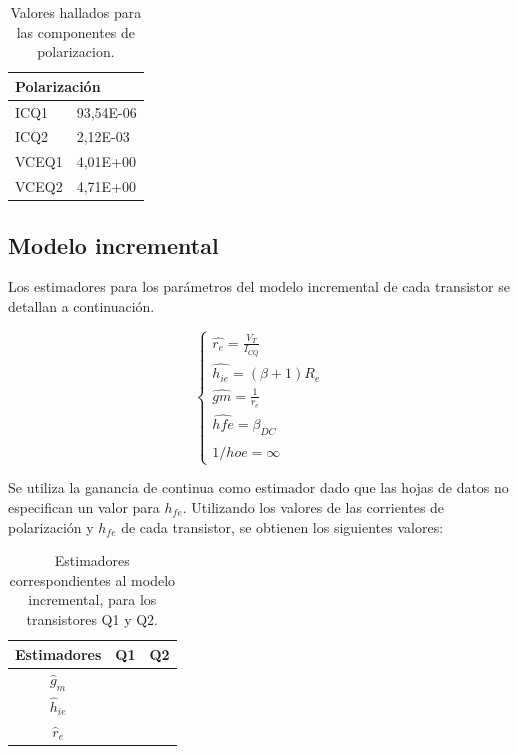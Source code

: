 \begin{table}[H]
	\centering
\begin{tabular}{ll}
\multicolumn{2}{l}{Polarización} \\ \hline
ICQ1          & 93,54E-06        \\
ICQ2         & 2,12E-03         \\
VCEQ1         & 4,01E+00         \\
VCEQ2         & 4,71E+00        
\end{tabular}
\caption{Valores hallados para las componentes de polarizacion.}
\label{tabla_valores_polarizacion}  
\end{table}


	\subsection{Modelo incremental}
	
	Los estimadores para los parámetros del modelo incremental de cada transistor se detallan a continuación.

		\begin{equation}
			\begin{cases}
			\widehat{r_{e}}=\frac{V_{T}}{I_{CQ}}\\
			\widehat{h_{ie}}=(\beta+1)R_{e}\\	
			\widehat{gm}=\frac{1}{r_{e}}\\
			\widehat{hfe}= \beta_{DC}\\
			\widehat{1/hoe}= \infty
			\end{cases}
			\label{mod_inc_ecs}
		\end{equation}
		
	Se utiliza la ganancia de continua como estimador dado que las hojas de datos no especifican un valor para $h_{fe}$. Utilizando los valores de las corrientes de polarización y $h_{fe}$ de cada transistor, se obtienen los siguientes valores:
	
	\begin{table}[h!]
		\centering
		\begin{tabular}{c c c}%
			\bfseries Estimadores & Q1 & Q2 \\ \hline
			$\widehat{g}_m$ &  & \\
			$\widehat{h}_{ie}$ &  & \\
			$\widehat{r}_{e}$&  & \\
			\hline
		\end{tabular}
		\caption{Estimadores correspondientes al modelo incremental, para los transistores Q1 y Q2.}
		\label{avolf}
	\end{table}
	
